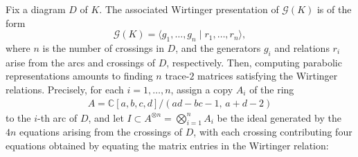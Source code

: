 \documentclass[12pt,reqno]{amsart}
\newcommand{\BC}{\mathbb{C}}
\newcommand{\calG}{\mathcal{G}}
\theoremstyle{definition}
\begin{document}
	Fix a diagram $D$ of $K$. The associated Wirtinger presentation of $\calG(K)$ is of the form
	$$
	\calG(K)=\langle g_1,\ldots,g_n\mid r_1,\ldots,r_n\rangle,
	$$
	where $n$ is the number of crossings in $D$, and the generators $g_i$ and relations $r_i$ arise from the arcs and crossings of $D$, respectively. Then, computing parabolic representations amounts to finding $n$ trace-$2$ matrices satisfying the Wirtinger relations. Precisely, for each $i=1,\ldots, n$, assign a copy $A_i$ of the ring
	\begin{align*}
		A=\BC[a,b,c,d]/(a d-b c-1, \, a+d-2)
	\end{align*}    
	to the $i$-th arc of $D$, and let $I\subset A^{\otimes n} = \bigotimes_{i=1}^n A_i$ be the ideal generated by the $4n$ equations arising from the crossings of $D$, with each crossing contributing four equations obtained by equating the matrix entries in the Wirtinger relation:
\end{document}
